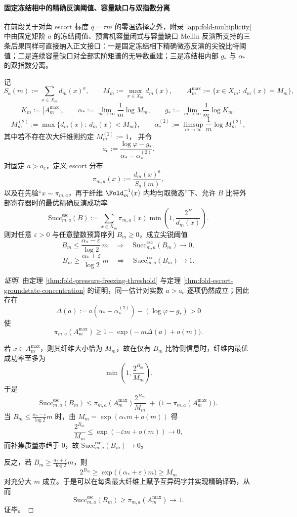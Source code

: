 \paragraph{固定冻结相中的精确反演阈值、容量缺口与双指数分离}
在前段关于对角 escort 标度 \(q=\tau m\) 的零温选择之外，附录 \ref{app:fold-multiplicity} 中由固定矩阶 \(a\) 的冻结阈值、预言机容量闭式与容量缺口 Mellin 反演所支持的三条后果同样可直接纳入正文接口：一是固定冻结相下精确微态反演的尖锐比特阈值；二是连续容量缺口对全部实阶矩谱的无导数重建；三是冻结相内部 \(g_*\) 与 \(\alpha_*\) 的双指数分离。

\begin{conclusion}[固定冻结相中精确微态反演的尖锐比特阈值]\label{con:xi-terminal-fixed-freezing-escort-oracle-sharp-threshold}
记
\[
S_a(m):=\sum_{x\in X_m}d_m(x)^a,\qquad
M_m:=\max_{x\in X_m}d_m(x),\qquad
A_m^{\max}:=\{x\in X_m:\ d_m(x)=M_m\},
\]
\[
K_m:=|A_m^{\max}|,\qquad
\alpha_*:=\lim_{m\to\infty}\frac{1}{m}\log M_m,\qquad
g_*:=\lim_{m\to\infty}\frac{1}{m}\log K_m,
\]
\[
M_m^{(2)}:=\max\{d_m(x):\ d_m(x)<M_m\},\qquad
\alpha_*^{(2)}:=\limsup_{m\to\infty}\frac{1}{m}\log M_m^{(2)},
\]
其中若不存在次大纤维则约定 \(M_m^{(2)}:=1\)，
并令
\[
a_{\mathrm c}:=\frac{\log\varphi-g_*}{\alpha_*-\alpha_*^{(2)}}.
\]
对固定 \(a>a_{\mathrm c}\)，定义 escort 分布
\[
\pi_{m,a}(x):=\frac{d_m(x)^a}{S_a(m)},
\]
以及在先验“\(x\sim \pi_{m,a}\)，再于纤维 \(\Fold_m^{-1}(x)\) 内均匀取微态”下、允许 \(B\) 比特外部寄存器时的最优精确反演成功率
\[
\mathrm{Succ}^{\mathrm{esc}}_{m,a}(B)
:=
\sum_{x\in X_m}\pi_{m,a}(x)\min\!\left(1,\frac{2^B}{d_m(x)}\right).
\]
则对任意 \(\varepsilon>0\) 与任意整数预算序列 \(B_m\ge 0\)，成立尖锐阈值
\[
B_m\le \frac{\alpha_*-\varepsilon}{\log 2}\,m
\quad\Longrightarrow\quad
\mathrm{Succ}^{\mathrm{esc}}_{m,a}(B_m)\longrightarrow 0,
\]
\[
B_m\ge \frac{\alpha_*+\varepsilon}{\log 2}\,m
\quad\Longrightarrow\quad
\mathrm{Succ}^{\mathrm{esc}}_{m,a}(B_m)\longrightarrow 1.
\]
\end{conclusion}
\begin{proof}[证明]
由定理 \ref{thm:fold-pressure-freezing-threshold} 与定理 \ref{thm:fold-escort-groundstate-concentration} 的证明，同一估计对实数 \(a>a_{\mathrm c}\) 逐项仍然成立；因此存在
\[
\Delta(a):=a(\alpha_*-\alpha_*^{(2)})-(\log\varphi-g_*)>0
\]
使
\[
\pi_{m,a}(A_m^{\max})
\ge
1-\exp\!\bigl(-m\Delta(a)+o(m)\bigr).
\]

若 \(x\in A_m^{\max}\)，则其纤维大小恰为 \(M_m\)，故在仅有 \(B_m\) 比特侧信息时，纤维内最优成功率至多为
\[
\min\!\left(1,\frac{2^{B_m}}{M_m}\right).
\]
于是
\[
\mathrm{Succ}^{\mathrm{esc}}_{m,a}(B_m)
\le
\pi_{m,a}(A_m^{\max})\frac{2^{B_m}}{M_m}
\;+\;
\bigl(1-\pi_{m,a}(A_m^{\max})\bigr).
\]
当
\(
B_m\le \frac{\alpha_*-\varepsilon}{\log 2}m
\)
时，由 \(M_m=\exp(\alpha_*m+o(m))\) 得
\[
\frac{2^{B_m}}{M_m}\le \exp(-\varepsilon m+o(m))\longrightarrow 0,
\]
而补集质量亦趋于 \(0\)，故 \(\mathrm{Succ}^{\mathrm{esc}}_{m,a}(B_m)\to 0\)。

反之，若
\(
B_m\ge \frac{\alpha_*+\varepsilon}{\log 2}m
\)，则
\[
2^{B_m}\ge \exp\!\bigl((\alpha_*+\varepsilon)m\bigr)\ge M_m
\]
对充分大 \(m\) 成立。于是可以在每条最大纤维上赋予互异码字并实现精确译码，从而
\[
\mathrm{Succ}^{\mathrm{esc}}_{m,a}(B_m)\ge \pi_{m,a}(A_m^{\max})\longrightarrow 1.
\]
证毕。
\end{proof}

